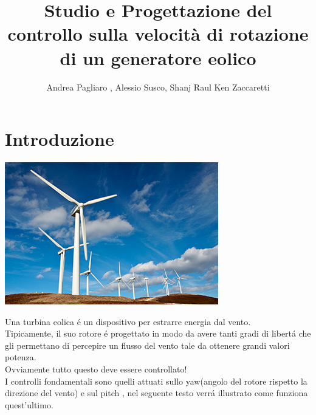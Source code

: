 \documentclass[a4paper,13pt]{article}
\begin{document}
\author{Andrea Pagliaro , Alessio Susco, Shanj Raul Ken Zaccaretti}
\title{Studio e Progettazione del controllo sulla velocità di rotazione di un generatore eolico}
\maketitle
\section{Introduzione}
\begin{center}
\includegraphics[scale=0.6]{graph/paleoliche.jpg}
\end{center}
Una turbina eolica \'e un dispositivo per estrarre energia dal vento.\\
Tipicamente, il suo rotore \'e progettato in modo da avere tanti gradi di libert\'a
che gli permettano di percepire un flusso del vento tale da ottenere grandi valori potenza.\\
Ovviamente tutto questo deve essere controllato!\\
I controlli fondamentali sono quelli attuati sullo yaw(angolo del rotore rispetto la direzione del vento) e sul pitch , nel seguente testo verr\'a illustrato come funziona quest'ultimo.   
\end{document}
